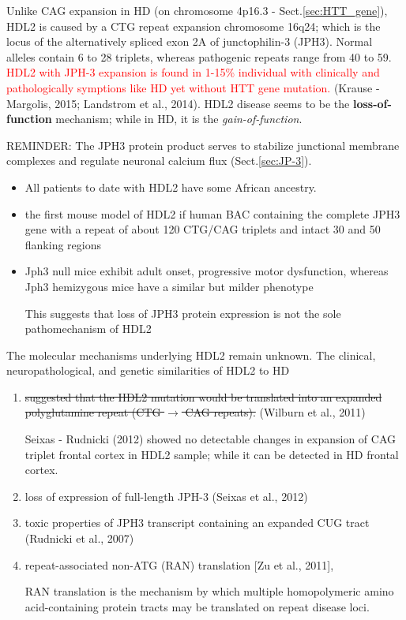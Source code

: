 Unlike CAG expansion in HD (on chromosome 4p16.3 - Sect.\ref{sec:HTT_gene}),
HDL2 is caused by a CTG repeat expansion chromosome 16q24; which is the locus of
the alternatively spliced exon 2A of junctophilin-3 (JPH3). Normal alleles
contain 6 to 28 triplets, whereas pathogenic repeats range from 40 to 59.
\textcolor{red}{HDL2 with JPH-3 expansion is found in 1-15\% individual with
clinically and pathologically symptions like HD yet without HTT gene mutation.}
(Krause - Margolis, 2015; Landstrom et al., 2014).
HDL2 disease seems to be the {\bf loss-of-function} mechanism; while in HD, it
is the {\it gain-of-function}.

REMINDER: The JPH3 protein product serves to stabilize junctional membrane
complexes and regulate neuronal calcium flux (Sect.\ref{sec:JP-3}).

\begin{itemize}
  \item All patients to date with HDL2 have some African ancestry.
  
  
  \item the first mouse model of HDL2 if human BAC containing the complete JPH3
  gene with a repeat of about 120 CTG/CAG triplets and intact 30 and 50 flanking regions

  \item Jph3 null mice exhibit adult onset, progressive motor dysfunction,
  whereas Jph3 hemizygous mice have a similar but milder phenotype

This suggests that loss of JPH3 protein expression is not the sole
pathomechanism of HDL2

\end{itemize}

The molecular mechanisms underlying HDL2 remain unknown. The clinical,
neuropathological, and genetic similarities of HDL2 to HD 
\begin{enumerate}
  
  \item \sout{suggested that the HDL2 mutation would be translated into an
  expanded polyglutamine repeat (CTG $\rightarrow$ CAG repeats).}  (Wilburn et
  al., 2011)
  
  
  Seixas - Rudnicki (2012) showed no detectable changes in expansion of CAG
  triplet frontal cortex in HDL2 sample; while it can be detected in HD frontal
  cortex.

  \item loss of expression of full-length JPH-3  (Seixas et al., 2012)
  
  
  
  \item  toxic properties of JPH3 transcript containing an expanded CUG tract
  (Rudnicki et al., 2007)

  \item repeat-associated non-ATG (RAN) translation [Zu et al., 2011],
  
  RAN translation is the mechanism by which multiple homopolymeric amino
  acid-containing protein tracts may be translated on repeat disease loci.
  
\end{enumerate}





